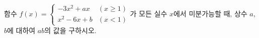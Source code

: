 함수 $f(x)=\begin{cases} -3x^2+ax & (x\ge 1) \\ x^2-6x+b & (x<1) \end{cases}$가 모든 실수 $x$에서 미분가능할 때, 상수 $a$, $b$에 대하여 $ab$의 값을 구하시오.
